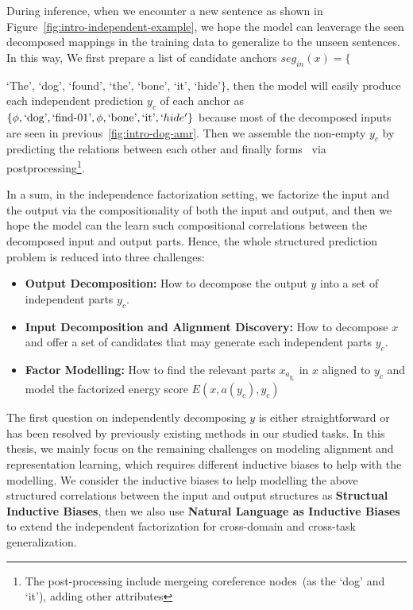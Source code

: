 During inference, when we encounter a new sentence as shown in
Figure~\ref{fig:intro-independent-example}, we hope the model can
leaverage the seen decomposed mappings in the training data to
generalize to the unseen sentences. In this way, We first prepare a
list of candidate anchors $seg_{in}(x)=\{${`The', `dog', `found',
  `the', `bone', `it', `hide'$\}$, then the model will easily produce
  each independent prediction $y_{c}$ of each anchor as
  $\{\phi,\text{`dog'}, \text{`find-01'}, \phi, \text{`bone'},\text{`it'},
  `hide'\}$ because most of the decomposed inputs are seen in
  previous~\autoref{fig:intro-dog-amr}. Then we assemble the non-empty
  $y_{c}$ by predicting the relations between each other and finally
  forms \OUT~via postprocessing\footnote{The post-processing include
    mergeing coreference nodes~(as the `dog' and `it'), adding other
    attributes}.

   In a sum, in
  the independence factorization setting, we factorize the input and
  the output via the compositionality of both the input and output,
  and then we hope the model can the learn such compositional
  correlations between the decomposed input and output parts. Hence,
  the whole structured prediction problem is reduced into three
  challenges:
\begin{itemize}
\item \textbf{Output Decomposition:} How to decompose the output $y$
  into a set of independent parts $y_{c}$.

\item \textbf{Input Decomposition and Alignment Discovery:} How to decompose $x$ and offer a
  set of candidates that may generate each independent parts $y_{c}$.
\item \textbf{Factor Modelling:} How to find the relevant parts
  $x_{a_{y_{c}}}$ in $x$ aligned to ${y_{c}}$ and model the factorized
  energy score $E(x, a(y_{c}), y_{c})$
\end{itemize}

The first question on independently decomposing $y$ is either
straightforward or has been resolved by previously existing methods in
our studied tasks. In this thesis, we mainly focus on the remaining
challenges on modeling alignment and representation learning, which
requires different inductive biases to help with the
modelling. We consider the inductive biases to
help modelling the above structured correlations between the input and
output structures as \textbf{Structual Inductive Biases}, then we also
use \textbf{Natural Language as Inductive Biases} to extend the
independent factorization for cross-domain and cross-task
generalization.

}
